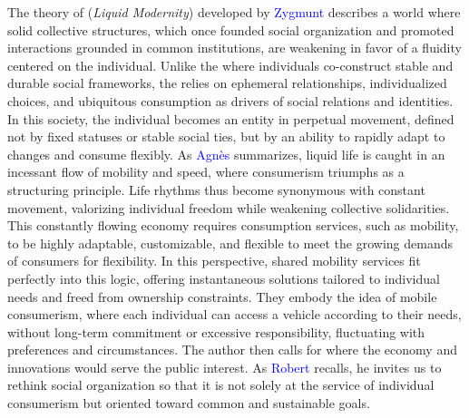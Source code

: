 \begin{refsegment}
{    The theory of  (\textsl{Liquid Modernity}) developed by \textcolor{blue}{Zygmunt} \textcolor{blue}{\textcite[7-28]{bauman_liquid_2000}} describes a world where solid collective structures, which once founded social organization and promoted interactions grounded in common institutions, are weakening in favor of a fluidity centered on the individual. Unlike the  where individuals co-construct stable and durable social frameworks, the  relies on ephemeral relationships, individualized choices, and ubiquitous consumption as drivers of social relations and identities. In this society, the individual becomes an entity in perpetual movement, defined not by fixed statuses or stable social ties, but by an ability to rapidly adapt to changes and consume flexibly. As \textcolor{blue}{Agnès} \textcolor{blue}{\textcite[2]{falabregues_bauman_2014}} summarizes, liquid life is caught in an incessant flow of mobility and speed, where consumerism triumphs as a structuring principle. Life rhythms thus become synonymous with constant movement, valorizing individual freedom while weakening collective solidarities. This constantly flowing economy requires consumption services, such as mobility, to be highly adaptable, customizable, and flexible to meet the growing demands of consumers for flexibility. In this perspective, shared mobility services fit perfectly into this logic, offering instantaneous solutions tailored to individual needs and freed from ownership constraints. They embody the idea of mobile consumerism, where each individual can access a vehicle according to their needs, without long-term commitment or excessive responsibility, fluctuating with preferences and circumstances. The author then calls for  where the economy and innovations would serve the public interest. As \textcolor{blue}{Robert} \textcolor{blue}{\textcite{maggiori_zygmunt_2017}} recalls, he invites us to rethink social organization so that it is not solely at the service of individual consumerism but oriented toward common and sustainable goals.
}
\end{refsegment}
